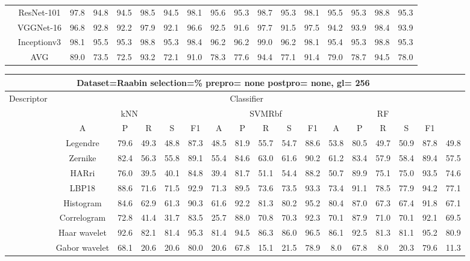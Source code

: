 \documentclass[12pt,italian]{article}
\begin{document}
\begin{tiny}
\begin{longtable}{lcccccccccccccccc}
& ResNet-101 & 97.8 & 94.8 & 94.5 & 98.5 & 94.5 & 98.1 & 95.6 & 95.3 & 98.7 & 95.3 & 98.1 & 95.5 & 95.3 & 98.8 & 95.3 \\ 
& VGGNet-16 & 96.8 & 92.8 & 92.2 & 97.9 & 92.1 & 96.6 & 92.5 & 91.6 & 97.7 & 91.5 & 97.5 & 94.2 & 93.9 & 98.4 & 93.9 \\ 
& Inceptionv3 & 98.1 & 95.5 & 95.3 & 98.8 & 95.3 & 98.4 & 96.2 & 96.2 & 99.0 & 96.2 & 98.1 & 95.4 & 95.3 & 98.8 & 95.3 \\ 
\hline
& AVG & 89.0 & 73.5 & 72.5 & 93.2 & 72.1 & 91.0 & 78.3 & 77.6 & 94.4 & 77.1 & 91.4 & 79.0 & 78.7 & 94.5 & 78.0 \\ 
\hline
\bottomrule
\end{longtable} 

 \pagebreak 
\begin{longtable}{lcccccccccccccccc}
\toprule
\multicolumn{16}{c}{Dataset=Raabin selection=\% prepro= none postpro= none, gl= 256} \\ 
\toprule
Descriptor & \multicolumn{15}{c}{Classifier} \\ 
& \multicolumn{5}{c}{kNN} & \multicolumn{5}{c}{SVMRbf} & \multicolumn{5}{c}{RF} \\ 
& A & P & R & S & F1 & A & P & R & S & F1 & A & P & R & S & F1 \\ 
\midrule
& Legendre & 79.6 & 49.3 & 48.8 & 87.3 & 48.5 & 81.9 & 55.7 & 54.7 & 88.6 & 53.8 & 80.5 & 49.7 & 50.9 & 87.8 & 49.8 \\ 
& Zernike & 82.4 & 56.3 & 55.8 & 89.1 & 55.4 & 84.6 & 63.0 & 61.6 & 90.2 & 61.2 & 83.4 & 57.9 & 58.4 & 89.4 & 57.5 \\ 
& HARri & 76.0 & 39.5 & 40.1 & 84.8 & 39.4 & 81.7 & 51.1 & 54.4 & 88.2 & 50.7 & 89.9 & 75.1 & 75.0 & 93.5 & 74.6 \\ 
& LBP18 & 88.6 & 71.6 & 71.5 & 92.9 & 71.3 & 89.5 & 73.6 & 73.5 & 93.3 & 73.4 & 91.1 & 78.5 & 77.9 & 94.2 & 77.1 \\ 
& Histogram & 84.6 & 62.9 & 61.3 & 90.3 & 61.6 & 92.2 & 81.3 & 80.2 & 95.2 & 80.4 & 87.0 & 67.3 & 67.4 & 91.8 & 67.1 \\ 
& Correlogram & 72.8 & 41.4 & 31.7 & 83.5 & 25.7 & 88.0 & 70.8 & 70.3 & 92.3 & 70.1 & 87.9 & 71.0 & 70.1 & 92.1 & 69.5 \\ 
& Haar wavelet & 92.6 & 82.1 & 81.4 & 95.3 & 81.4 & 94.5 & 86.3 & 86.0 & 96.5 & 86.1 & 92.5 & 81.3 & 81.1 & 95.2 & 80.9 \\ 
& Gabor wavelet & 68.1 & 20.6 & 20.6 & 80.0 & 20.6 & 67.8 & 15.1 & 21.5 & 78.9 &  8.0 & 67.8 &  8.0 & 20.3 & 79.6 & 11.3 \\ 

\end{longtable}
\end{tiny}
\end{document}
